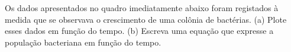 Os dados apresentados no quadro imediatamente abaixo foram registados à medida que se observava o crescimento de uma colônia de bactérias. (a) Plote esses dados em função do tempo. (b) Escreva uma equação que expresse a população bacteriana em função do tempo.

